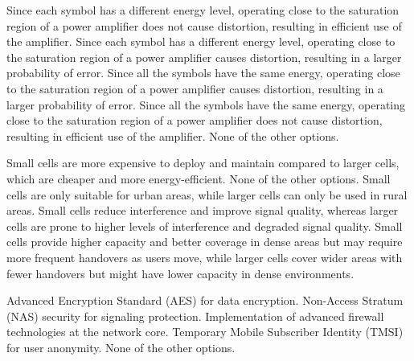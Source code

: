 \begin{questions}
    \begin{checkboxes}
        \choice Since each symbol has a different energy level, operating close to the saturation region of a power amplifier does not cause distortion, resulting in efficient use of the amplifier.
        \choice Since each symbol has a different energy level, operating close to the saturation region of a power amplifier causes distortion, resulting in a larger probability of error.
        \choice Since all the symbols have the same energy, operating close to the saturation region of a power amplifier causes distortion, resulting in a larger probability of error.
        \CorrectChoice Since all the symbols have the same energy, operating close to the saturation region of a power amplifier does not cause distortion, resulting in efficient use of the amplifier.
        \choice None of the other options.
    \end{checkboxes}


    \begin{checkboxes}
        \choice Small cells are more expensive to deploy and maintain compared to larger cells, which are cheaper and more energy-efficient.
        \choice None of the other options.
        \choice Small cells are only suitable for urban areas, while larger cells can only be used in rural areas.
        \choice Small cells reduce interference and improve signal quality, whereas larger cells are prone to higher levels of interference and degraded signal quality.
        \CorrectChoice Small cells provide higher capacity and better coverage in dense areas but may require more frequent handovers as users move, while larger cells cover wider areas with fewer handovers but might have lower capacity in dense environments.
    \end{checkboxes}

    \begin{checkboxes}
        \CorrectChoice Advanced Encryption Standard (AES) for data encryption.
        \CorrectChoice Non-Access Stratum (NAS) security for signaling protection.
        \choice Implementation of advanced firewall technologies at the network core.
        \choice Temporary Mobile Subscriber Identity (TMSI) for user anonymity.
        \choice None of the other options.
    \end{checkboxes}


\end{questions}

